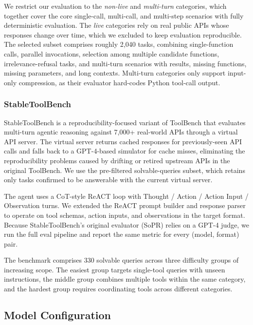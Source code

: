 \documentclass[11pt]{article}
\begin{document}
We restrict our evaluation to the \emph{non-live} and \emph{multi-turn} categories, which together cover the core single-call, multi-call, and multi-step scenarios with fully deterministic evaluation. The \emph{live} categories rely on real public APIs whose responses change over time, which we excluded to keep evaluation reproducible. The selected subset comprises roughly 2{,}040 tasks, combining single-function calls, parallel invocations, selection among multiple candidate functions, irrelevance-refusal tasks, and multi-turn scenarios with results, missing functions, missing parameters, and long contexts. Multi-turn categories only support input-only compression, as their evaluator hard-codes Python tool-call output.

\subsubsection{StableToolBench}
StableToolBench \citep{Guo_Cheng_Wang_Liang_Qin_Li_Liu_Sun_Liu_2025} is a reproducibility-focused variant of ToolBench \citep{qin2024toolllm} that evaluates multi-turn agentic reasoning against 7{,}000+ real-world APIs through a virtual API server. The virtual server returns cached responses for previously-seen API calls and falls back to a GPT-4-based simulator for cache misses, eliminating the reproducibility problems caused by drifting or retired upstream APIs in the original ToolBench. We use the pre-filtered solvable-queries subset, which retains only tasks confirmed to be answerable with the current virtual server.

The agent uses a CoT-style ReACT loop \citep{yao2023react} with Thought / Action / Action Input / Observation turns. We extended the ReACT prompt builder and response parser to operate on tool schemas, action inputs, and observations in the target format. Because StableToolBench's original evaluator (SoPR) relies on a GPT-4 judge, we run the full eval pipeline and report the same metric for every (model, format) pair.

The benchmark comprises 330 solvable queries across three difficulty groups of increasing scope. The easiest group targets single-tool queries with unseen instructions, the middle group combines multiple tools within the same category, and the hardest group requires coordinating tools across different categories.

\subsection{Model Configuration}
\label{sec:model}
\end{document}
